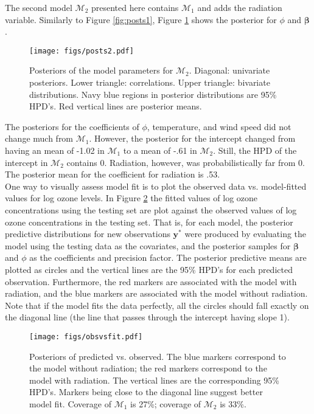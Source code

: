 \documentclass{../../tex_template/asaproc}
\newcommand{\y}{\bm y}
\newcommand{\M}{\mathcal{M}}
\begin{document}
The second model $\M_2$ presented here contains $\M_1$ and adds the radiation
variable. Similarly to Figure \ref{fig:posts1}, Figure \ref{fig:posts2} shows
the posterior for $\phi$ and $\bm\beta$.
\begin{figure}[H]
  \texttt{[image: figs/posts2.pdf]}
  \caption{\small Posteriors of the model parameters for $\M_2$. Diagonal: univariate posteriors. 
  Lower triangle: correlations. Upper triangle: bivariate distributions. Navy blue regions
  in posterior distributions are 95\% HPD's. Red vertical lines are posterior means.}
  \label{fig:posts2}
\end{figure}
The posteriors for the coefficients of $\phi$, temperature, and wind speed
did not change much from $\M_1$. However, the posterior for the intercept changed
from having an mean of -1.02 in $\M_1$ to a mean of -.61 in $\M_2$. Still, the
HPD of the intercept in $\M_2$ contains 0. Radiation, however, was probabilistically
far from 0. The posterior mean for the coefficient for radiation is .53. \\

One way to visually assess model fit is to plot the observed data vs.
model-fitted values for log ozone levels. In Figure \ref{fig:obsvsfit}
the fitted values of log ozone concentrations using the testing set are plot
against the observed values of log ozone concentrations in the testing set.
That is, for each model, the posterior predictive distributions for new observations
$\y^*$ were produced by evaluating the model using the testing data as the covariates,
and the posterior samples for $\bm\beta$ and $\phi$ as the coefficients and precision
factor. The posterior predictive means are plotted as circles and the vertical lines
are the 95\% HPD's for each predicted observation. Furthermore, the red markers 
are associated with the model with radiation, and the blue markers are associated with
the model without radiation. Note that if the model fits the data perfectly,
all the circles should fall exactly on the diagonal line (the line that passes
through the intercept having slope 1).\\

\begin{figure}[H]
  \texttt{[image: figs/obsvsfit.pdf]}
  \caption{\small Posteriors of predicted vs. observed. The blue markers correspond to 
  the model without radiation; the red markers correspond to the model with radiation.
  The vertical lines are the corresponding 95\% HPD's. Markers being close to the
  diagonal line suggest better model fit. Coverage of $\M_1$ is 27\%; coverage 
  of $\M_2$ is 33\%.}
  \label{fig:obsvsfit}
\end{figure}
\end{document}
